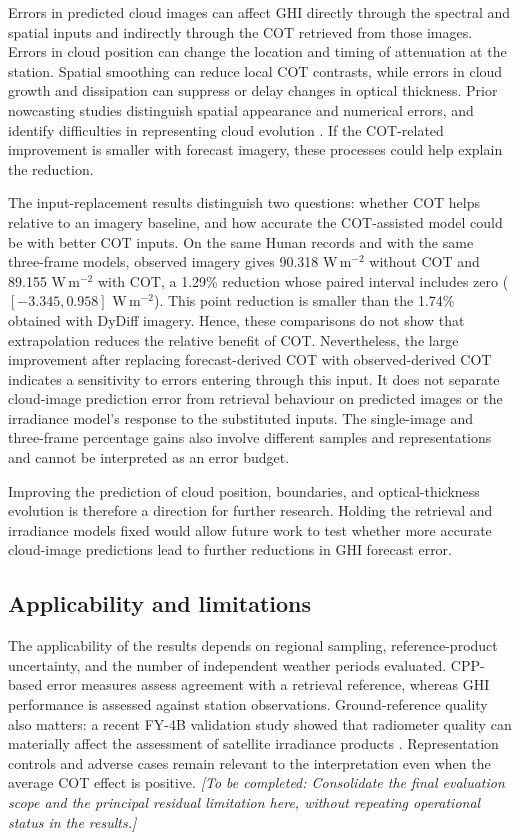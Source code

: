 \documentclass[11pt]{article}
\newcommand{\pending}[1]{{\color{pendingcolor}\textit{[To be completed: #1]}}}
\begin{document}
Errors in predicted cloud images can affect GHI directly through the spectral and spatial inputs and indirectly through the COT retrieved from those images. Errors in cloud position can change the location and timing of attenuation at the station. Spatial smoothing can reduce local COT contrasts, while errors in cloud growth and dissipation can suppress or delay changes in optical thickness. Prior nowcasting studies distinguish spatial appearance and numerical errors, and identify difficulties in representing cloud evolution \cite{chen2024,cui2024}. If the COT-related improvement is smaller with forecast imagery, these processes could help explain the reduction.

The input-replacement results distinguish two questions: whether COT helps relative to an imagery baseline, and how accurate the COT-assisted model could be with better COT inputs. On the same Hunan records and with the same three-frame models, observed imagery gives 90.318 W\,m$^{-2}$ without COT and 89.155 W\,m$^{-2}$ with COT, a 1.29\% reduction whose paired interval includes zero ($[-3.345,0.958]$ W\,m$^{-2}$). This point reduction is smaller than the 1.74\% obtained with DyDiff imagery. Hence, these comparisons do not show that extrapolation reduces the relative benefit of COT. Nevertheless, the large improvement after replacing forecast-derived COT with observed-derived COT indicates a sensitivity to errors entering through this input. It does not separate cloud-image prediction error from retrieval behaviour on predicted images or the irradiance model's response to the substituted inputs. The single-image and three-frame percentage gains also involve different samples and representations and cannot be interpreted as an error budget.

Improving the prediction of cloud position, boundaries, and optical-thickness evolution is therefore a direction for further research. Holding the retrieval and irradiance models fixed would allow future work to test whether more accurate cloud-image predictions lead to further reductions in GHI forecast error.

\subsection{Applicability and limitations}
The applicability of the results depends on regional sampling, reference-product uncertainty, and the number of independent weather periods evaluated. CPP-based error measures assess agreement with a retrieval reference, whereas GHI performance is assessed against station observations. Ground-reference quality also matters: a recent FY-4B validation study showed that radiometer quality can materially affect the assessment of satellite irradiance products \cite{chen2025fy4b}. Representation controls and adverse cases remain relevant to the interpretation even when the average COT effect is positive. \pending{Consolidate the final evaluation scope and the principal residual limitation here, without repeating operational status in the results.}
\end{document}
